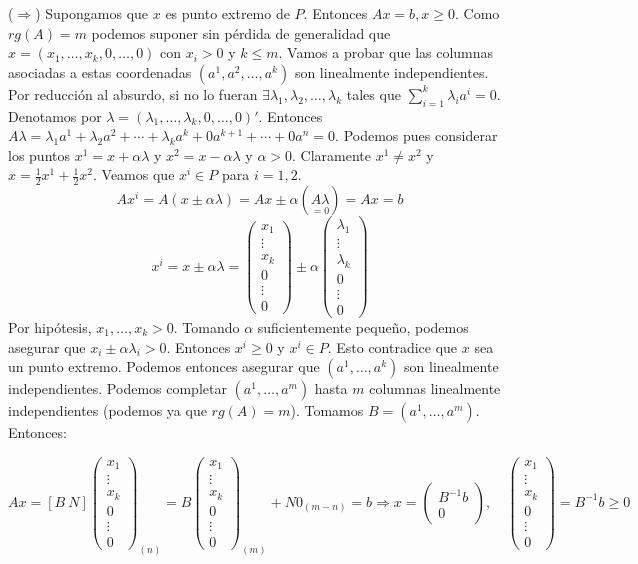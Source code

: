 \documentclass[PM.tex]{subfiles}
\begin{document}
\begin{dem}
($\Rightarrow$) Supongamos que $x$ es punto extremo de $P$. Entonces $Ax=b, x ≥ 0$. Como $rg(A) = m$ podemos suponer sin pérdida de generalidad que $x =(x_1,\dots,x_k,0,\dots,0)$ con $x_i > 0$ y $k ≤ m$.
Vamos a probar que las columnas asociadas a estas coordenadas $(a^1, a^2, \dots, a^k)$ son linealmente independientes. Por reducción al absurdo, si no lo fueran $\exists λ_1,λ_2, \dots, λ_k$ tales que $\sum_{i=1}^k λ_i a^i = 0$. Denotamos por $λ =(λ_1,\dots,λ_k,0,\dots,0)'$. Entonces $Aλ=λ_1a^1 + λ_2a^2 + \cdots + λ_ka^k + 0a^{k+1}+\cdots+0a^n = 0$. Podemos pues considerar los puntos $x^1 = x+αλ$ y $x^2 = x-αλ$ y $α > 0$. Claramente $x^1 \neq x^2$ y $x = \frac{1}{2}x^1+ \frac{1}{2}x^2$. Veamos que $x^i \in P$ para $i=1,2$.
\[ Ax^i = A(x \pm αλ) = Ax \pm α(\underset{=0}{Aλ}) = Ax = b \]
\[ x^i = x \pm αλ = \begin{pmatrix}x_1\\\vdots\\x_k\\0\\\vdots\\0\end{pmatrix} \pm α \begin{pmatrix}λ_1\\\vdots\\λ_k\\0\\\vdots\\0\end{pmatrix} \]
Por hipótesis, $x_1,\dots,x_k > 0$. Tomando $α$ suficientemente pequeño, podemos asegurar que $x_i \pm αλ_i > 0$. Entonces $x^i \geq 0$ y $x^i \in P$. Esto contradice que $x$ sea un punto extremo. Podemos entonces asegurar que $(a^1,\dots,a^k)$ son linealmente independientes. Podemos completar $(a^1,\dots,a^m)$ hasta $m$ columnas linealmente independientes (podemos ya que $rg(A) = m$). Tomamos $B = (a^1,\dots,a^m)$. Entonces:


\[ Ax =[B\ N]\begin{pmatrix}x_1\\\vdots\\x_k\\0\\\vdots\\0\end{pmatrix}_{(n)} = B \begin{pmatrix}x_1\\\vdots\\x_k\\0\\\vdots\\0\end{pmatrix}_{(m)} +N0_{(m-n)} = b \Rightarrow x = \begin{pmatrix}B^{-1}b\\0\end{pmatrix}, \quad \begin{pmatrix}x_1\\\vdots\\x_k\\0\\\vdots\\0\end{pmatrix} = B^{-1}b \geq 0   \]
\end{dem}
\end{document}
